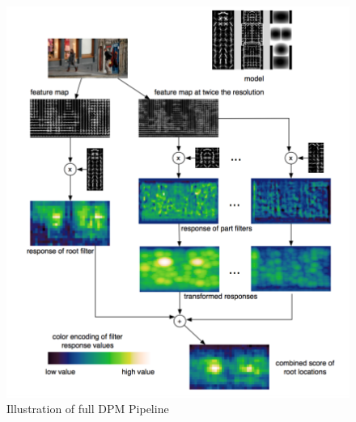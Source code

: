 \documentclass{article}
\begin{document}
\begin{figure}[ht]
	\center
	\includegraphics[scale=0.6]{pipeline.png}
    \caption{Illustration of full DPM Pipeline}
    \label{fig:pipeline1}
\end{figure}
\end{document}
